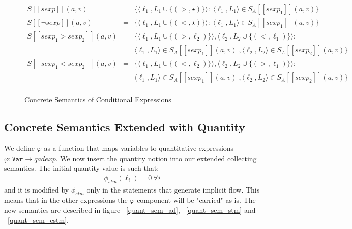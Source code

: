 \documentclass{llncs}
\begin{document}
\begin{figure}[H]
{\small \[
\begin{array}{rcl}
S [\![sexp]\!](a, v) & = &  \{  \langle \ell_1, L_1 \cup \{(>, \star)\} \rangle  : \;\langle \ell_1, L_1 \rangle \in  S_A [\![sexp_1 ]\!](a, v) \}\; \\
S [\![\neg sexp]\!](a, v) & = &  \{  \langle \ell_1, L_1 \cup \{(<, \star)\} \rangle : \;\langle \ell_1, L_1 \rangle \in  S_A [\![sexp_1 ]\!](a, v) \}\; \\
S [\![sexp_1 > sexp_2]\!](a, v) & = &  \{  \langle \ell_1, L_1 \cup \{(>, \ell_2)\} \rangle,  \langle \ell_2, L_2 \cup \{(< , \ell_1) \} \rangle : \; \\
& & \langle \ell_1, L_1 \rangle \in  S_A [\![sexp_1 ]\!](a, v) \; , \langle \ell_2, L_2 \rangle \in  S_A [\![sexp_2]\!](a, v) \}\; \\
S [\![sexp_1 < sexp_2]\!](a, v) & = & \{  \langle \ell_1, L_1 \cup \{(<, \ell_2)\} \rangle,  \langle \ell_2, L_2 \cup \{(> , \ell_1) \} \rangle : \; \\
& & \langle \ell_1, L_1 \rangle \in  S_A [\![sexp_1 ]\!](a, v) \; , \langle \ell_2, L_2 \rangle \in  S_A [\![sexp_2]\!](a, v) \}\; \\
\end{array}
\]}
\caption{Concrete Semantics of Conditional Expressions}
\label{sem_cond}
\end{figure} 

\subsection{Concrete Semantics Extended with Quantity}
We define $\varphi$ as a function that maps variables to quantitative expressions $\varphi : \texttt{Var} \rightarrow qadexp$. We now insert the quantity notion into our extended collecting semantics. The initial quantity value is such that: 
\begin{align*}
\phi_{stm} (\ell_i) = 0\ \forall i
\end{align*}
and it is modified by $\phi_{stm}$ only in the statements that generate implicit flow. This means that in the other expressions the $\varphi$ component will be "carried" as is. The new semantics are described in figure ~\ref{quant_sem_ad}, ~\ref{quant_sem_stm} and ~\ref{quant_sem_cstm}. 
\end{document}
